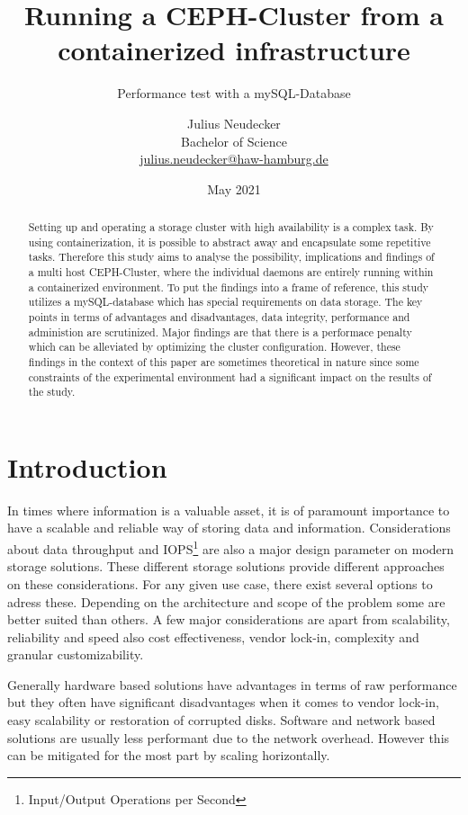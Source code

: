 \documentclass[titlepage, a4paper, 11pt]{scrartcl}
\title{Running a CEPH-Cluster from a containerized infrastructure}
\subtitle{Performance test with a mySQL-Database}
\author{Julius Neudecker \\ Bachelor of Science \\ \href{mailto:julius.neudecker@haw-hamburg.de}{julius.neudecker@haw-hamburg.de}}
\date{May 2021}
\begin{document}
    \maketitle

    \tableofcontents

    \begin{abstract}

        Setting up and operating a storage cluster with high availability is a complex task. 
        By using containerization, it is possible to abstract away and encapsulate some repetitive tasks.
        Therefore this study aims to analyse the possibility, implications and findings of a multi host
        CEPH-Cluster, where the individual daemons are entirely running within a containerized environment.
        To put the findings into a frame of reference, this study utilizes a mySQL-database which has 
        special requirements on data storage. The key points in terms of advantages and disadvantages,
        data integrity, performance and administion are scrutinized. Major findings are that there is a performace penalty which can be alleviated by optimizing the cluster configuration. However, these findings in the context of this paper are sometimes theoretical in nature since some constraints of the experimental environment had a significant impact on the results of the study.

    \end{abstract}

    \section{Introduction}

        In times where information is a valuable asset, it is of paramount importance to have a scalable and reliable
        way of storing data and information. Considerations about data throughput and 
        IOPS\footnote{Input/Output Operations per Second} are also a major design parameter on modern storage solutions.
        These different storage solutions provide different approaches on these considerations. For any given use case, there
        exist several options to adress these. Depending on the architecture and scope of the problem some are better
        suited than others. A few major considerations are apart from scalability, reliability and speed also cost effectiveness,
        vendor lock-in, complexity and granular customizability.

        Generally hardware based solutions have advantages in terms of raw performance but they often have significant disadvantages
        when it comes to vendor lock-in, easy scalability or restoration of corrupted disks. Software and network based solutions are
        usually less performant due to the network overhead. However this can be mitigated for the most part by scaling horizontally.
\end{document}
